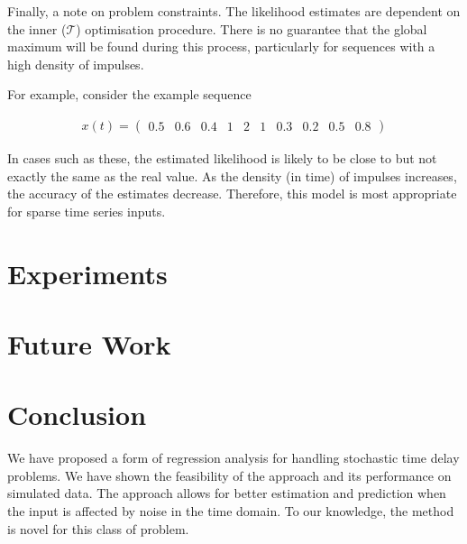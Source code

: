 \documentclass[11pt]{amsart}
\begin{document}
Finally, a note on problem constraints. The likelihood estimates are dependent on the inner ($\mathcal{T}$) optimisation procedure. There is no guarantee that the global maximum will be found during this process, particularly for sequences with a high density of impulses. 

For example, consider the example sequence 

\begin{align}
    x(t) = 
    \left(
\begin{array}{cccccccccc}
    0.5 & 0.6 & 0.4 & 1 & 2 & 1 &
    0.3 & 0.2 & 0.5 & 0.8 
\end{array}  
\right)
\end{align}



In cases such as these, the estimated likelihood is likely to be close to but not exactly the same as the real value. As the density (in time) of impulses increases, the accuracy of the estimates decrease. Therefore, this model is most appropriate for sparse time series inputs.


\section{Experiments}

\section{Future Work}

\section{Conclusion}

We have proposed a form of regression analysis for handling stochastic time delay problems. We have shown the feasibility of the approach and its performance on simulated data. The approach allows for better estimation and prediction when the input is affected by noise in the time domain. To our knowledge, the method is novel for this class of problem.
\end{document}
